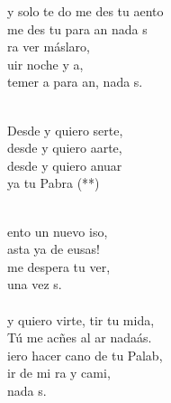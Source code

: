 \begin{cancion}%
	y solo te do  me des tu aento\\
	 me des tu  para an nada s \\
	ra ver máslaro,\\
	uir noche y a, \\
	temer a  para an, nada s. \\\jump\\
	\begin{chorus}%
	Desde y quiero serte,\\
	desde y quiero aarte,\\
	desde y quiero anuar\\
	ya tu Pabra (**)\\
	\end{chorus}%
	\jump\\
	ento un nuevo iso,\\
	asta ya de eusas!\\
	me despera tu ver,\\
	una vez s. \\
\jump\\
	y quiero virte, tir tu mida,\\
	 Tú me acñes al ar nadaás.\\
	iero hacer cano de tu Palab,\\
	ir de mi ra y cami,\\
	nada s. \\
\end{cancion}%
